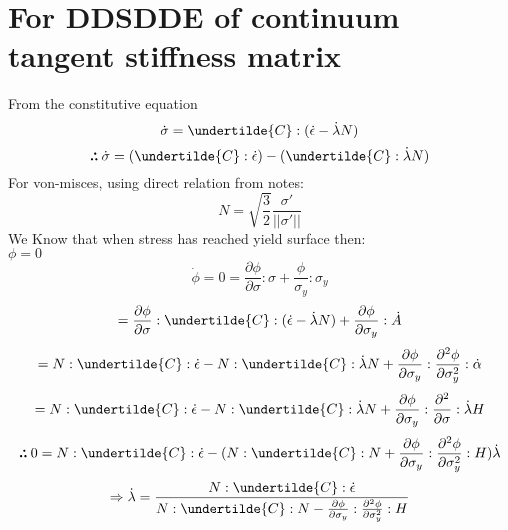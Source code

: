\documentclass{article}
\def\therefore{\boldsymbol{\text{ }
\leavevmode
\lower0.4ex\hbox{$\cdot$}
\kern-.4em\raise0.5ex\hbox{$\cdot$}
\kern-0.55em\lower0.4ex\hbox{$\cdot$}
\thinspace\text{ }}}
\begin{document}
\section{For DDSDDE of continuum tangent stiffness matrix}
From the constitutive equation
\begin{equation}
    \dot{\sigma} = \undertilde{C}:(\dot{\epsilon}- \dot{\lambda} N)
\end{equation}
\begin{equation}
    \therefore \dot{\sigma}=(\undertilde{C}:\dot{\epsilon})-(\undertilde{C}:\dot{\lambda}N)
\end{equation}
For von-misces, using direct relation from notes:
\begin{equation}
    N= \sqrt{\frac{3}{2}} \frac{\sigma\prime}{||\sigma\prime||}
\end{equation}
We Know that when stress has reached yield surface then:\\
$\phi=0$
\begin{equation}
    \dot{\phi}=0=\frac{\partial \phi}{\partial \sigma}:\sigma + \frac{\phi}{\sigma_{y}}:\sigma_{y}
\end{equation}
\begin{equation}
    =\frac{\partial \phi}{\partial \sigma}: \undertilde{C}:(\dot{\epsilon} - \dot{\lambda} N) + \frac{\partial \phi}{\partial \sigma_{y}}:\dot{A}
\end{equation}
\begin{equation}
    =N:\undertilde{C}:\dot{\epsilon} - N:\undertilde{C}:\dot{\lambda}N + \frac{\partial \phi}{\partial \sigma_{y}}: \frac{\partial^{2} \phi}{\partial \sigma_{y}^{2}}:\dot{\alpha}
\end{equation}
\begin{equation}
    =N:\undertilde{C}:\dot{\epsilon} - N:\undertilde{C}:\dot{\lambda}N +\frac{\partial \phi}{\partial \sigma_{y}}:\frac{\partial^{2}}{\partial \sigma} :\dot{\lambda}H
\end{equation}
\begin{equation}
    \therefore 0 = N:\undertilde{C}:\dot{\epsilon} - (N:\undertilde{C}: N +\frac{\partial \phi}{\partial \sigma_{y}}:\frac{\partial^{2} \phi}{\partial \sigma_{y}^{2}}:H)\dot{\lambda} 
\end{equation}
\begin{equation}
    \Rightarrow \dot{\lambda} = \frac{N:\undertilde{C}:\dot{\epsilon}}{N: \undertilde{C}:N - \frac{\partial \phi}{\partial \sigma_{y}} :\frac{\partial^{2} \phi}{\partial \sigma_{y}^{2}}:H}
\end{equation}
\end{document}
